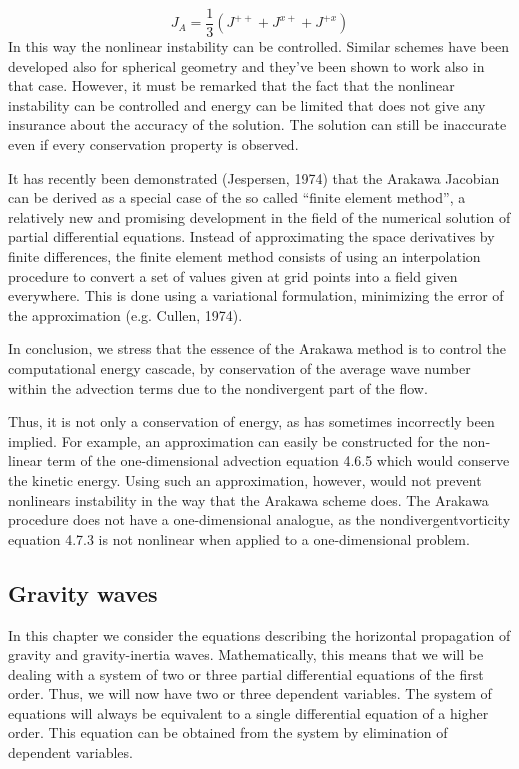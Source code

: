 $$J_A=\frac{1}{3}\left(J^{++}+J^{x+}+ J^{+x}\right)$$
In this way the nonlinear instability can be controlled. Similar schemes have been developed also for spherical geometry and they've been shown to work also in that case. However, it must be remarked that the fact that the nonlinear instability can be controlled and energy can be limited that does not give any insurance about the accuracy of the solution. The solution can still be inaccurate even if every conservation property is observed.


It has recently been demonstrated (Jespersen, 1974) that the Arakawa Jacobian can be derived as a special case of the so called “finite element method”, a relatively new and promising development in the field of the numerical solution of partial differential equations. Instead of approximating the space derivatives by finite differences, the finite element method consists of using an interpolation procedure to convert a set of values given at grid points into a field given everywhere. This is done using a variational formulation, minimizing the error of the approximation (e.g. Cullen, 1974).

In conclusion, we stress that the essence of the Arakawa method is to control the computational energy cascade, by conservation of the average wave number within the advection terms due to the nondivergent part of the flow.

Thus, it is not only a conservation of energy, as has sometimes incorrectly been implied. For example, an approximation can easily be constructed for the non­linear term of the one-dimensional advection equation 4.6.5 which would conserve the kinetic energy. Using such an approximation, however, would not prevent nonlinears instability in the way that the Arakawa scheme does. The Arakawa procedure does not have a one-dimensional analogue, as the nondivergentvorticity equation 4.7.3 is not nonlinear when applied to a one-dimensional problem.


\subsection{Gravity waves}
In this chapter we consider the equations describing the horizontal propagation of gravity and gravity-inertia waves. Mathematically, this means that we will be dealing with a system of two or three partial differential equa­tions of the first order. Thus, we will now have two or three dependent variables. The system of equations will always be equivalent to a single differential equation of a higher order. This equation can be obtained from the system by elimination of dependent variables.


